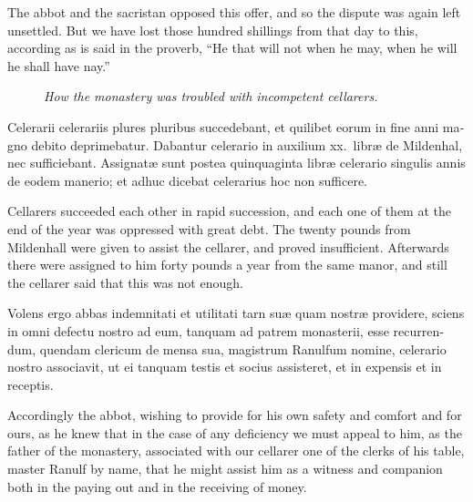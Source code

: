 \documentclass{book}
\newcommand{\blockhead}[4][]{
\begin{figure}
\centering
\vspace{#4}
\parbox{2.75cm}{\begin{center}\footnotesize \color{BrickRed} \emph{#2}\\ #1 \end{center}}
\end{figure}
}
\begin{document}
\begin{paracol}{2}
\switchcolumn

The abbot and the sacristan opposed this offer, and so the dispute was again left unsettled. But we have lost those hundred shillings from that day to this, according as is said in the proverb, ``He that will not when he may, when he will he shall have nay.''

\switchcolumn*

\begin{otherlanguage}{latin}
\blockhead{How the monastery was troubled with incompetent cellarers.}{4}{-.45cm}
Celerarii celerariis plures pluribus succedebant, et quilibet eorum in fine anni magno debito deprimebatur. Dabantur celerario in auxilium xx.\ libr\ae{} de Mildenhal, nec sufficiebant. Assignat\ae{} sunt postea quinquaginta libr\ae{} celerario singulis annis de eodem manerio; et adhuc dicebat celerarius hoc non sufficere.

\end{otherlanguage}

\switchcolumn

Cellarers succeeded each other in rapid succession, and each one of them at the end of the year was oppressed with great debt. The twenty pounds from Mildenhall were given to assist the cellarer, and proved insufficient. Afterwards there were assigned to him forty pounds a year from the same manor, and still the cellarer said that this was not enough.

\switchcolumn*

\begin{otherlanguage}{latin}
Volens ergo abbas indemnitati et utilitati tarn su\ae{} quam nostr\ae{} providere, sciens in omni defectu nostro ad eum, tanquam ad patrem monasterii, esse recurrendum, quendam clericum de mensa sua, magistrum Ranulfum nomine, celerario nostro associavit, ut ei tanquam testis et socius assisteret, et in expensis et in receptis.
\end{otherlanguage}

\switchcolumn

Accordingly the abbot, wishing to provide for his own safety and comfort and for ours, as he knew that in the case of any deficiency we must appeal to him, as the father of the monastery, associated with our cellarer one of the clerks of his table, master Ranulf by name, that he might assist him as a witness and companion both in the paying out and in the receiving of money.

\switchcolumn*


\end{paracol}
\end{document}
